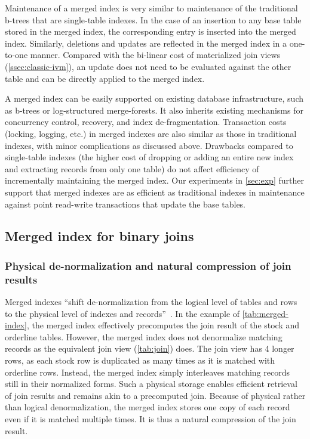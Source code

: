 \documentclass[biblatex, english]{lni}
\begin{document}
Maintenance of a merged index is very similar to maintenance of the traditional b-trees that are single-table indexes.
In the case of an insertion to any base table stored in the merged index, the corresponding entry is inserted into the merged index.
Similarly, deletions and updates are reflected in the merged index in a one-to-one manner.
Compared with the bi-linear cost of materialized join views (\cref{ssec:classic-ivm}), an update does not need to be evaluated against the other table and can be directly applied to the merged index.

A merged index can be easily supported on existing database infrastructure, such as b-trees or log-structured merge-forests.
It also inherits existing mechanisms for concurrency control, recovery, and index de-fragmentation.
Transaction costs (locking, logging, etc.) in merged indexes are also similar as those in traditional indexes, with minor complications as discussed above.
Drawbacks compared to single-table indexes (the higher cost of dropping or adding an entire new index and extracting records from only one table) do not affect efficiency of incrementally maintaining the merged index.
Our experiments in \cref{sec:exp} further support that merged indexes are as efficient as traditional indexes in maintenance against point read-write transactions that update the base tables.

\subsection{Merged index for binary joins}

\subsubsection{Physical de-normalization and natural compression of join results}

Merged indexes ``shift de-normalization from the logical level of tables and rows to the physical level of indexes and records''~\cite{graefe2007merged}.
In the example of \cref{tab:merged-index}, the merged index effectively precomputes the join result of the stock and orderline tables.
However, the merged index does not denormalize matching records as the equivalent join view (\cref{tab:join}) does.
The join view has 4 longer rows, as each stock row is duplicated as many times as it is matched with orderline rows.
Instead, the merged index simply interleaves matching records still in their normalized forms.
Such a physical storage enables efficient retrieval of join results and remains akin to a precomputed join.
Because of physical rather than logical denormalization, the merged index stores one copy of each record even if it is matched multiple times.
It is thus a natural compression of the join result.
\end{document}
